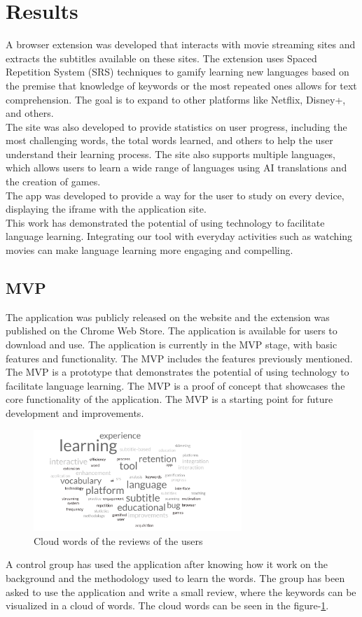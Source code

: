 \documentclass[12pt]{article}
\begin{document}
\section{Results}
A browser extension was developed that interacts with movie streaming sites and extracts the subtitles available on these sites. The extension uses Spaced Repetition System (SRS) techniques to gamify learning new languages based on the premise that knowledge of keywords or the most repeated ones allows for text comprehension. The goal is to expand to other platforms like Netflix, Disney+, and others. \\ 
The site was also developed to provide statistics on user progress, including the most challenging words, the total words learned, and others to help the user understand their learning process. The site also supports multiple languages, which allows users to learn a wide range of languages using AI translations and the creation of games.  \\
The app was developed to provide a way for the user to study on every device, displaying the iframe with the application site.\\
This work has demonstrated the potential of using technology to facilitate language learning. Integrating our tool with everyday activities such as watching movies can make language learning more engaging and compelling. 

\subsection{MVP}
The application was publicly released on the website and the extension was published on the Chrome Web Store. The application is available for users to download and use. The application is currently in the MVP stage, with basic features and functionality. The MVP includes the features previously mentioned. \\
The MVP is a prototype that demonstrates the potential of using technology to facilitate language learning. The MVP is a proof of concept that showcases the core functionality of the application. The MVP is a starting point for future development and improvements. \\
\begin{figure}[!h]
  \centering
  \caption{
  Cloud words of the reviews of the users
  }
  \label{fig:cloud_words}
  \includegraphics[width=0.7\textwidth]{assets/33.png}
\end{figure}
A control group has used the application after knowing how it work on the background and the methodology used to learn the words. The group has been asked to use the application and write a small review, where the keywords can be visualized in a cloud of words. The cloud words can be seen in the figure-\ref{fig:cloud_words}.
\end{document}
